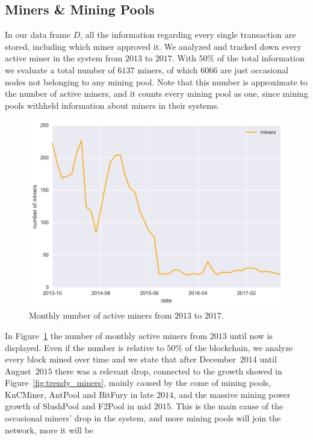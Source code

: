 \documentclass[USenglish]{uit-thesis}
\begin{document}
\subsection{Miners \& Mining Pools}
\label{sec:minersminingpools}
In our data frame $D$, all the information
regarding every single transaction are stored,
including which miner approved it. We analyzed and
tracked down every active miner in the system from $2013$ to $2017$.
With $50\%$ of the total information we evaluate a total number
of $6137$ miners, of which $6066$ are just
occasional nodes not belonging
to any mining pool. Note that this number is
approximate to the number of active miners, and
it counts every mining pool as one, since mining
pools withheld information about miners in their
systems.
\begin{figure}[h]
	\centering
	\includegraphics[width=1\textwidth]{img/number_of_miners}
	\caption{Monthly number of active miners from $2013$ to $2017$.}
	\label{fig:number_of_miners}
\end{figure}
In Figure~\ref{fig:number_of_miners} the number
of monthly active miners from $2013$ until now is displayed.
Even if the number is relative to $50\%$ of the
blockchain, we analyze every block mined over time and we state
that after December~$2014$ until August~$2015$
there was a relevant drop, connected to the growth
showed in Figure~\ref{fig:trendy_miners},
mainly caused by the come of mining
pools, KnCMiner, AntPool and BitFury in late $2014$, and the massive
mining power growth of SlushPool and F2Pool in mid $2015$.
This is the main cause of the occasional miners' drop in the system,
and more mining pools will join the network, more it will be
\end{document}
